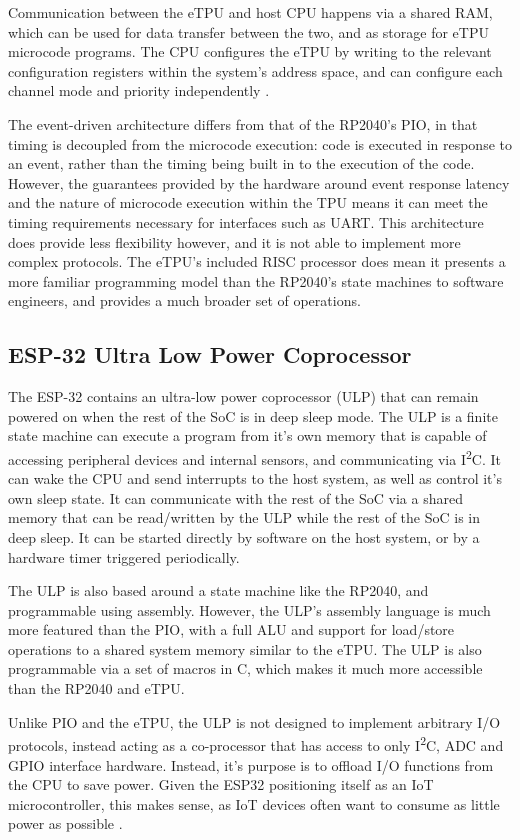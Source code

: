 Communication between the eTPU and host CPU happens via a shared RAM, which can be used for data transfer between the two, and as storage for eTPU microcode programs. The CPU configures the eTPU by writing to the relevant configuration registers within the system's address space, and can configure each channel mode and priority independently \cite{etpu}.

The event-driven architecture differs from that of the RP2040's PIO, in that timing is decoupled from the microcode execution: code is executed in response to an event, rather than the timing being built in to the execution of the code. However, the guarantees provided by the hardware around event response latency and the nature of microcode execution within the TPU means it can meet the timing requirements necessary for interfaces such as UART. This architecture does provide less flexibility however, and it is not able to implement more complex protocols. The eTPU's included RISC processor does mean it presents a more familiar programming model than the RP2040's state machines to software engineers, and provides a much broader set of operations.

\subsection{ESP-32 Ultra Low Power Coprocessor}

The ESP-32 contains an ultra-low power coprocessor (ULP) that can remain powered on when the rest of the SoC is in deep sleep mode. The ULP is a finite state machine can execute a program from it's own memory that is capable of accessing peripheral devices and internal sensors, and communicating via I\textsuperscript{2}C. It can wake the CPU and send interrupts to the host system, as well as control it's own sleep state. It can communicate with the rest of the SoC via a shared memory that can be read/written by the ULP while the rest of the SoC is in deep sleep. It can be started directly by software on the host system, or by a hardware timer triggered periodically.

The ULP is also based around a state machine like the RP2040, and programmable using assembly. However, the ULP's assembly language is much more featured than the PIO, with a full ALU and support for load/store operations to a shared system memory similar to the eTPU. The ULP is also programmable via a set of macros in C, which makes it much more accessible than the RP2040 and eTPU.

Unlike PIO and the eTPU, the ULP is not designed to implement arbitrary I/O protocols, instead acting as a co-processor that has access to only I\textsuperscript{2}C, ADC and GPIO interface hardware. Instead, it's purpose is to offload I/O functions from the CPU to save power. Given the ESP32 positioning itself as an IoT microcontroller, this makes sense, as IoT devices often want to consume as little power as possible \cite{esp32}.

